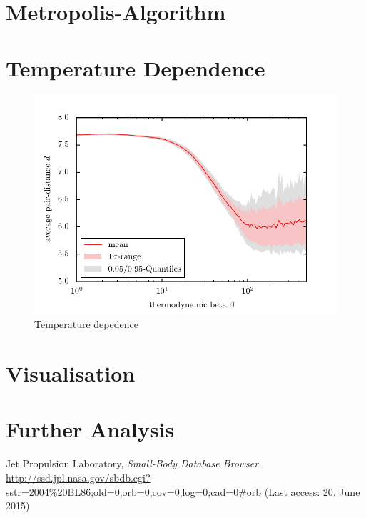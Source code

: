 \documentclass[11pt, a4paper]{article}
\numberwithin{equation}{section}
\begin{document}
\section{Metropolis-Algorithm} \label{Sec:Metropolis}
\section{Temperature Dependence} \label{Sec:Temperature}

\begin{figure}
	\centering
	\includegraphics{./figures/temp_dep_coulomb2d.pdf}
	\caption{Temperature depedence}
\end{figure}


\section{Visualisation} \label{Sec:Visualisation}
\section{Further Analysis} \label{Sec:Further_Analysis}

\FloatBarrier
\vspace{\fill}
\begin{thebibliography}{9}
	Jet Propulsion Laboratory,
	\emph{Small-Body Database Browser},\\
	\url{http://ssd.jpl.nasa.gov/sbdb.cgi?sstr=2004%20BL86;old=0;orb=0;cov=0;log=0;cad=0#orb} (Last access: 20. June 2015)
\end{thebibliography}
\end{document}
